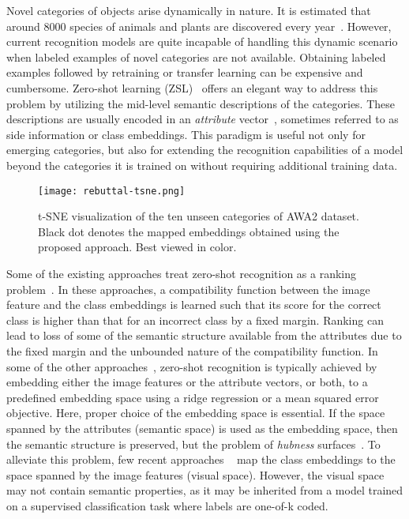 \documentclass[10pt,twocolumn,letterpaper]{article}
\begin{document}
Novel categories of objects arise dynamically in nature. It is estimated that around 8000 species of animals and plants are discovered every year~\cite{numObj}.  
However, current recognition models are quite incapable of handling this dynamic scenario when labeled examples of novel categories  are not available. 
Obtaining labeled examples followed by retraining or transfer learning can be expensive and cumbersome. 
Zero-shot learning  (ZSL)~\cite{palatucci2009zero,akata2013label,norouzi2013zero,socher2013zero,zhang2016zero,lampert2014attribute} offers an elegant way to address this problem by utilizing the mid-level semantic descriptions of the categories.  These descriptions are usually encoded in an \textit{attribute} vector~\cite{ferrari2008learning,farhadi2009describing,farhadi2010attribute}, sometimes referred to as side information or class embeddings. 
This paradigm is useful not only for emerging categories, but also for extending the recognition capabilities of a model beyond the categories it is trained on without requiring additional training data.
\begin{figure}[t]
	\centering
	\texttt{[image: rebuttal-tsne.png]}
	\caption{\small t-SNE visualization \cite{maaten2008visualizing} of the ten unseen categories of AWA2 \cite{xian2017zero1} dataset. Black dot denotes the mapped embeddings obtained using the proposed approach. Best viewed in color.}
	\label{tsne-awa} 
\end{figure} 

Some of the existing approaches treat zero-shot recognition as a ranking problem~\cite{akata2016label,xian2016latent,frome2013devise}. In these approaches, a compatibility function between the image feature and the class embeddings is learned such that its score for the correct class is higher than that for an incorrect class by a fixed margin. 
Ranking can lead to loss of some of the semantic structure available from the attributes due to the fixed margin and the unbounded nature of the compatibility function. 
In some of the other approaches~\cite{Kodirov_2017_CVPR,zhang2016learning,romera2015embarrassingly}, zero-shot recognition is typically achieved by embedding either the image features or the attribute vectors, or both, to a predefined embedding space using a ridge regression or a mean squared error objective.
Here, proper choice of the embedding space is essential.
If the space spanned by the attributes (semantic space) is used as the embedding space, then the semantic  structure is preserved, but the problem of \textit{hubness} surfaces~\cite{shigeto2015ridge,radovanovic2010hubs}.
To alleviate this problem, few recent approaches ~\cite{zhang2016learning, shigeto2015ridge} map the class embeddings to  the space spanned by the image features (visual space). 
However, the visual space may not contain semantic properties, as it may be inherited from a model trained on a supervised classification task where labels are one-of-k coded.
\end{document}
